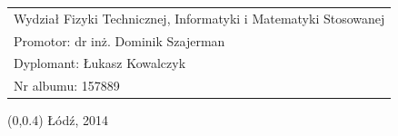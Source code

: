 \documentclass[12pt, oneside, a4paper]{mwbk}
\begin{document}
\begin{titlepage}
\begin{center}
\selectfont
\hspace{-1cm}
\begin{tabular}{l}
Wydział Fizyki Technicznej, Informatyki i Matematyki Stosowanej \\
Promotor: dr inż. Dominik Szajerman \\
Dyplomant: Łukasz Kowalczyk \\
Nr albumu: 157889
\end{tabular}
\end{center}
\vspace{-.5cm}
\begin{center}
\selectfont
\begin{textblock}{13}(0,0.4)
Łódź, 2014
\end{textblock}
\end{center}
\end{titlepage}

\tableofcontents



\listoffigures


\end{document}
